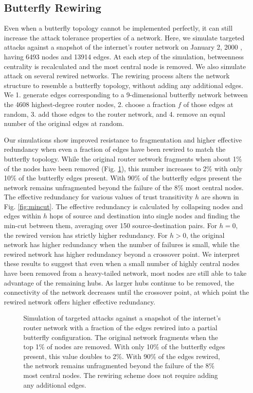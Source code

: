 \documentclass[10pt,letterpaper]{article}
\begin{document}
\subsection*{Butterfly Rewiring}

Even when a butterfly topology cannot be implemented perfectly,
it can still increase the attack tolerance properties of a network.
Here, we simulate targeted attacks against a snapshot of the internet's
router network on January 2, 2000
\cite{leskovec_graphs_2005}, having 6493 nodes and 13914 edges.
At each step of the simulation, betweenness centrality is recalculated and the
most central node is removed.
We also simulate attack on several rewired networks.
The rewiring process alters the network structure to resemble a butterfly
topology, without adding any additional edges.
We 1. generate edges corresponding to a 9-dimensional butterfly network between
the 4608 highest-degree router nodes,
2. choose a fraction $f$ of those edges at random,
3. add those edges to the router network, and
4. remove an equal number of the original edges at random.

Our simulations show improved resistance to fragmentation and higher
effective redundancy when even a fraction of edges have been rewired to
match the butterfly topology.
While the original router network fragments when about 1\% of the nodes
have been removed (Fig. \ref{fig:diameter}),
this number increases to 2\%
with only 10\% of the butterfly edges present.
With 90\% of the butterfly edges present
the network remains unfragmented beyond the failure of the 8\% most
central nodes.
The effective redundancy for various values of trust transitivity $h$
are shown in Fig. \ref{fig:mincut}.
The effective redundancy is calculated by collapsing nodes and edges within
$h$ hops of source and destination into single nodes and finding the min-cut
between them,
averaging over 150 source-destination pairs.
For $h=0$, the rewired version has strictly higher redundancy.
For $h>0$,
the original network has higher redundancy when the number of failures is small,
while the rewired network has higher redundancy beyond a crossover point.
We interpret these results to suggest that even when a small number of
highly central nodes have been removed from a heavy-tailed network,
most nodes are still able to take advantage of the remaining hubs.
As larger hubs continue to be removed, the connectivity of the network
decreases until the crossover point,
at which point the rewired network offers higher effective redundancy.

\begin{figure}[H]
\caption{
Simulation of targeted attacks against a snapshot of the internet's router
network with a fraction of the edges rewired into a partial butterfly configuration.
The original network fragments when the top 1\% of nodes are removed.
With only 10\% of the butterfly edges present,
this value doubles to 2\%.
With 90\% of the edges rewired,
the network remains unfragmented beyond the failure of the 8\% most
central nodes.
The rewiring scheme does not require adding any additional edges.
}
\label{fig:diameter}
\end{figure}
\end{document}
